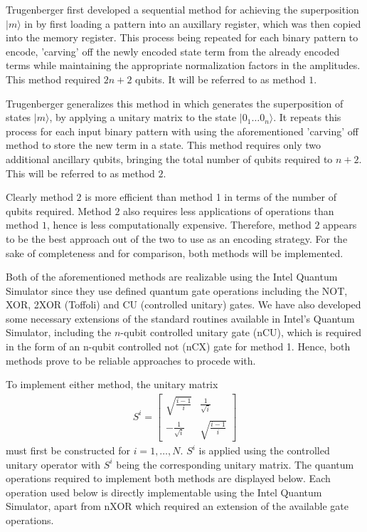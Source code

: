 Trugenberger first developed a sequential method for achieving the superposition $\vert m \rangle$ in \cite{Trugenberger_2001} by first loading a pattern into an auxillary register, which was then copied into the memory register. This process being repeated for each binary pattern to encode, 'carving' off the newly encoded state term from the already encoded terms while maintaining the appropriate normalization factors in the amplitudes. This method required $2n + 2$ qubits. It will be referred to as method $1$. 

Trugenberger generalizes this method in \cite{Trugenberger_2002} which generates the superposition of states $\vert m \rangle$, by applying a unitary matrix to the state $\vert 0_1\dots 0_n \rangle$. It repeats this process for each input binary pattern with using the aforementioned 'carving' off method to store the new term in a state. This method requires only two additional ancillary qubits, bringing the total number of qubits required to $n+2$. This will be referred to as method $2$.

Clearly method $2$ is more efficient than method 1 in terms of the number of qubits required. Method $2$ also requires less applications of operations than method $1$, hence is less computationally expensive. Therefore, method $2$ appears to be the best approach out of the two to use as an encoding strategy. For the sake of completeness and for comparison, both methods will be implemented.

Both of the aforementioned methods are realizable using the Intel Quantum Simulator since they use defined quantum gate operations including the NOT, XOR, 2XOR (Toffoli) and CU (controlled unitary) gates. We have also developed some necessary extensions of the standard routines available in Intel's Quantum Simulator, including the $n$-qubit controlled unitary gate (nCU), which is required in the form of an n-qubit controlled not (nCX) gate for method 1. Hence, both methods prove to be reliable approaches to procede with.

To implement either method, the unitary matrix
\begin{align}
    S^i = 
    \begin{bmatrix}
        \sqrt{\frac{i-1}{i}} & \frac{1}{\sqrt{i}} \\
        -\frac{1}{\sqrt{i}}  & \sqrt{\frac{i-1}{i}}
    \end{bmatrix}
\end{align}
must first be constructed for $i = 1,\dots,N$. $S^i$ is applied using the controlled unitary operator with $S^i$ being the corresponding unitary matrix. The quantum operations required to implement both methods are displayed below. Each operation used below is directly implementable using the Intel Quantum Simulator, apart from nXOR which required an extension of the available gate operations. 


